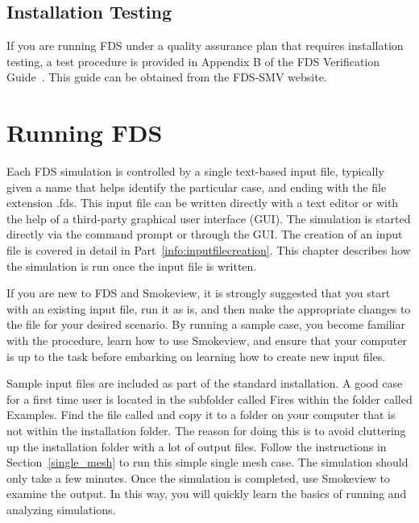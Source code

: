 \documentclass[11pt]{book}
\begin{document}
\section{Installation Testing}

If you are running FDS under a quality assurance plan that requires installation testing, a test procedure is provided in Appendix B of the FDS Verification Guide~\cite{FDS_Verification_Guide}.  This guide can be obtained from the FDS-SMV website.



\chapter{Running FDS}
\label{info:runningFDS}

Each FDS simulation is controlled by a single text-based input file, typically given a name that helps identify the particular case, and ending with the file extension {\ct .fds}. This input file can be written directly with a text editor or with the help of a third-party graphical user interface (GUI). The simulation is started directly via the command prompt or through the GUI. The creation of an input file is covered in detail in Part~\ref{info:inputfilecreation}. This chapter describes how the simulation is run once the input file is written.

If you are new to FDS and Smokeview, it is strongly suggested that you start with an existing input file, run it as is, and then make the appropriate changes to the file for your desired scenario. By running a sample case, you become familiar with the procedure, learn how to use Smokeview, and ensure that your computer is up to the task before embarking on learning how to create new input files.

Sample input files are included as part of the standard installation. A good case for a first time user is located in the subfolder called {\ct Fires} within the folder called {\ct Examples}. Find the file called  and copy it to a folder on your computer that is not within the installation folder. The reason for doing this is to avoid cluttering up the installation folder with a lot of output files. Follow the instructions in Section~\ref{single_mesh} to run this simple single mesh case. The simulation should only take a few minutes. Once the simulation is completed, use Smokeview to examine the output. In this way, you will quickly learn the basics of running and analyzing simulations.
\end{document}
